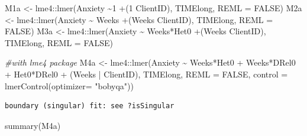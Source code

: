 \documentclass[
  english,
]{book}
\newenvironment{Shaded}{\begin{snugshade}}{\end{snugshade}}
\newcommand{\AttributeTok}[1]{\textcolor[rgb]{0.77,0.63,0.00}{#1}}
\newcommand{\CommentTok}[1]{\textcolor[rgb]{0.56,0.35,0.01}{\textit{#1}}}
\newcommand{\ConstantTok}[1]{\textcolor[rgb]{0.00,0.00,0.00}{#1}}
\newcommand{\FunctionTok}[1]{\textcolor[rgb]{0.00,0.00,0.00}{#1}}
\newcommand{\NormalTok}[1]{#1}
\newcommand{\OtherTok}[1]{\textcolor[rgb]{0.56,0.35,0.01}{#1}}
\newcommand{\SpecialCharTok}[1]{\textcolor[rgb]{0.00,0.00,0.00}{#1}}
\newcommand{\StringTok}[1]{\textcolor[rgb]{0.31,0.60,0.02}{#1}}
\begin{document}
M1a \textless- lme4::lmer(Anxiety \textasciitilde1 +(1 \textbar{} ClientID), TIMElong, REML = FALSE)
M2a \textless- lme4::lmer(Anxiety \textasciitilde{} Weeks +(Weeks \textbar{} ClientID), TIMElong, REML = FALSE)
M3a \textless- lme4::lmer(Anxiety \textasciitilde{} Weeks*Het0 +(Weeks \textbar{} ClientID), TIMElong, REML = FALSE)

\begin{Shaded}
\begin{Highlighting}[]
\CommentTok{\#with lme4 package}
\NormalTok{M4a }\OtherTok{\textless{}{-}}\NormalTok{ lme4}\SpecialCharTok{::}\FunctionTok{lmer}\NormalTok{(Anxiety }\SpecialCharTok{\textasciitilde{}}\NormalTok{ Weeks}\SpecialCharTok{*}\NormalTok{Het0 }\SpecialCharTok{+}\NormalTok{ Weeks}\SpecialCharTok{*}\NormalTok{DRel0 }\SpecialCharTok{+}\NormalTok{ Het0}\SpecialCharTok{*}\NormalTok{DRel0 }\SpecialCharTok{+}\NormalTok{ (Weeks }\SpecialCharTok{|}\NormalTok{ ClientID), TIMElong, }\AttributeTok{REML =} \ConstantTok{FALSE}\NormalTok{, }\AttributeTok{control =} \FunctionTok{lmerControl}\NormalTok{(}\AttributeTok{optimizer=} \StringTok{"bobyqa"}\NormalTok{))}
\end{Highlighting}
\end{Shaded}

\begin{verbatim}
boundary (singular) fit: see ?isSingular
\end{verbatim}

\begin{Shaded}
\begin{Highlighting}[]
\FunctionTok{summary}\NormalTok{(M4a)}
\end{Highlighting}
\end{Shaded}
\end{document}
